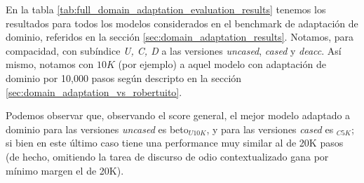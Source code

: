 

En la tabla \ref{tab:full_domain_adaptation_evaluation_results} tenemos los resultados para todos los modelos considerados en el benchmark de adaptación de dominio, referidos en la sección \ref{sec:domain_adaptation_results}. Notamos, para compacidad, con subíndice \emph{U, C, D} a las versiones  \emph{uncased}, \emph{cased} y \emph{deacc}. Así mismo, notamos con $10K$ (por ejemplo) a aquel modelo con adaptación de dominio por 10,000 pasos según descripto en la sección \ref{sec:domain_adaptation_vs_robertuito}.

Podemos observar que, observando el score general, el mejor modelo adaptado a dominio para las versiones \emph{uncased} es beto$_{U10K}$, y para las versiones \emph{cased} es \beto{}$_{C5K}$; si bien en este último caso tiene una performance muy similar al de 20K pasos (de hecho, omitiendo la tarea de discurso de odio contextualizado gana por mínimo margen el de 20K).

